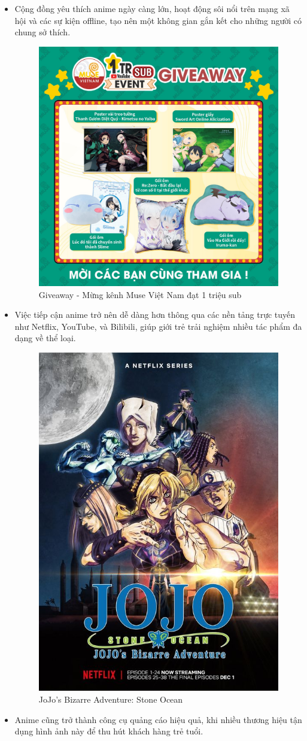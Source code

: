 \begin{itemize}
    \item Cộng đồng yêu thích anime ngày càng lớn, hoạt động sôi nổi trên mạng xã hội và các sự kiện offline, tạo nên một không gian gắn kết cho những người có chung sở thích.
    \begin{figure}[H]
    \centerline{\includegraphics[width=\linewidth, height=0.5\linewidth]{content/background/image/muse.jpg}}
    \caption{Giveaway - Mừng kênh Muse Việt Nam đạt 1 triệu sub}
    \label{fig}
    \end{figure}
    \item Việc tiếp cận anime trở nên dễ dàng hơn thông qua các nền tảng trực tuyến như Netflix, YouTube, và Bilibili, giúp giới trẻ trải nghiệm nhiều tác phẩm đa dạng về thể loại.
    \begin{figure}[H]
    \centerline{\includegraphics[width=\linewidth, height=0.5\linewidth]{content/background/image/netflix.jpg}}
    \caption{JoJo's Bizarre Adventure: Stone Ocean}
    \label{fig}
    \end{figure}
    \item Anime cũng trở thành công cụ quảng cáo hiệu quả, khi nhiều thương hiệu tận dụng hình ảnh này để thu hút khách hàng trẻ tuổi.
    \begin{figure}[H]

\end{figure}
\end{itemize}
